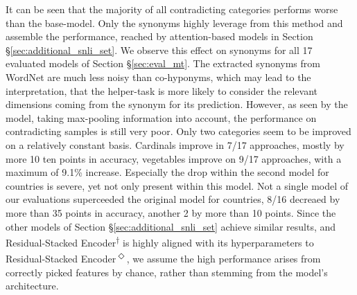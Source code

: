 It can be seen that the majority of all contradicting categories performs worse than the base-model. Only the synonyms highly leverage from this method and assemble the performance, reached by attention-based models in Section §\ref{sec:additional_snli_set}. We observe this effect on synonyms for all 17 evaluated models of Section §\ref{sec:eval_mt}. The extracted synonyms from WordNet are much less noisy than co-hyponyms, which may lead to the interpretation, that the helper-task is more likely to consider the relevant dimensions coming from the synonym for its prediction. However, as seen by the model, taking max-pooling information into account, the performance on contradicting samples is still very poor. Only two categories seem to be improved on a relatively constant basis. Cardinals improve in 7/17 approaches, mostly by more 10 ten points in accuracy, vegetables improve on 9/17 approaches, with a maximum of 9.1\% increase. Especially the drop within the second model for countries is severe, yet not only present within this model. Not a single model of our evaluations superceeded the original model for countries, 8/16 decreaed by more than 35 points in accuracy, another 2 by more than 10 points. Since the other models of Section §\ref{sec:additional_snli_set} achieve similar results, and Residual-Stacked Encoder\textsuperscript{$\dagger$} is highly aligned with its hyperparameters to Residual-Stacked Encoder\textsuperscript{$\Diamond$}, we assume the high performance arises from correctly picked features by chance, rather than stemming from the model's architecture. 

